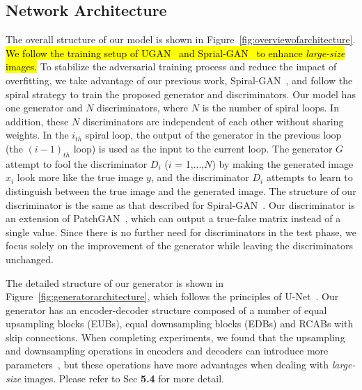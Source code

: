 \documentclass[utf8]{FrontiersinHarvard} %
\begin{document}
\subsection{Network Architecture}
The overall structure of our model is shown in Figure~\ref{fig:overviewofarchitecture}. \hl{We follow the training setup of UGAN~\citep{8460552} and Sprial-GAN~\citep{2020Underwater} to enhance \textit{large-size} images.} To stabilize the adversarial training process and reduce the impact of overfitting, we take advantage of our previous work, Spiral-GAN~\citep{2020Underwater}, and follow the spiral strategy to train the proposed generator and discriminators. Our model has one generator and $N$ discriminators, where $N$ is the number of spiral loops. In addition, these $N$ discriminators are independent of each other without sharing weights. In the $i_{th}$ spiral loop, the output of the generator in the previous loop (the $(i-1)_{th}$ loop) is used as the input to the current loop. The generator $G$ attempt to fool the discriminator $D_{i}$ ($i$ = 1,...,$N$) by making the generated image $x_{i}$ look more like the true image $y$, and the discriminator $D_{i}$ attempts to learn to distinguish between the true image and the generated image. The structure of our discriminator is the same as that described for Spiral-GAN~\citep{2020Underwater}. Our discriminator is an extension of PatchGAN~\citep{8100115}, which can output a true-false matrix instead of a single value. Since there is no further need for discriminators in the test phase, we focus solely on the improvement of the generator while leaving the discriminators unchanged. 

The detailed structure of our generator is shown in Figure~\ref{fig:generatorarchitecture}, which follows
the principles of U-Net~\citep{2015U}. Our generator has an encoder-decoder structure composed of a number of equal upsampling blocks (EUBs), equal downsampling blocks (EDBs) and RCABs with skip connections. When completing experiments, we found that the upsampling and downsampling operations in encoders and decoders can introduce more parameters~\citep{2021LAFFNet}, but these operations have more advantages when dealing with \textit{large-size} images. Please refer to Sec \textbf{5.4} for more detail.
\end{document}
